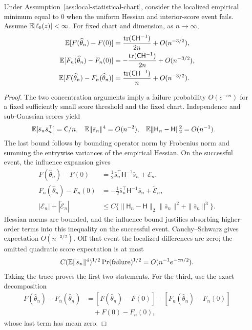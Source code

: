 \begin{theorem}
\label{thm:local-optimism}
Under Assumption~\ref{ass:local-statistical-chart}, consider the
localized empirical minimum equal to $0$ when the uniform Hessian
and interior-score event fails. Assume $\mathbb E|\ell_0(z)|<\infty$.
For fixed chart and dimension, as $n\to\infty$,
\begin{align}
\mathbb E[F(\widehat\theta_n)-F(0)]
&=\frac{\operatorname{tr}(\mathsf C\mathsf H^{-1})}{2n}
+O(n^{-3/2}),\\
\mathbb E[F_n(\widehat\theta_n)-F_n(0)]
&=-\frac{\operatorname{tr}(\mathsf C\mathsf H^{-1})}{2n}
+O(n^{-3/2}),\\
\mathbb E[F(\widehat\theta_n)-F_n(\widehat\theta_n)]
&=\frac{\operatorname{tr}(\mathsf C\mathsf H^{-1})}{n}
+O(n^{-3/2}).
\label{eq:local-optimism}
\end{align}
\end{theorem}
\begin{proof}
The two concentration arguments imply a failure probability
$O(e^{-cn})$ for a fixed sufficiently small score threshold and
the fixed chart. Independence and sub-Gaussian scores yield
\begin{align}
\mathbb E[\bar s_n\bar s_n^\top]&=\mathsf C/n,&
\mathbb E\|\bar s_n\|^4&=O(n^{-2}),&
\mathbb E\|\mathsf H_n-\mathsf H\|_2^2&=O(n^{-1}).
\end{align}
The last bound follows by bounding operator norm by Frobenius norm
and summing the entrywise variances of the empirical Hessian.
On the successful event, the influence expansion gives
\begin{align}
F(\widehat\theta_n)-F(0)
&=\tfrac12\bar s_n^\top\mathsf H^{-1}\bar s_n+\mathcal E_n,\\
F_n(\widehat\theta_n)-F_n(0)
&=-\tfrac12\bar s_n^\top\mathsf H^{-1}\bar s_n+\widetilde{\mathcal E}_n,\\
|\mathcal E_n|+|\widetilde{\mathcal E}_n|
&\leq C\{\|\mathsf H_n-\mathsf H\|_2\|\bar s_n\|^2+
\|\bar s_n\|^3\}.
\end{align}
Hessian norms are bounded, and the influence bound justifies
absorbing higher-order terms into this inequality on the
successful event. Cauchy--Schwarz gives expectation $O(n^{-3/2})$.
Off that event the localized differences are zero; the omitted
quadratic score expectation is at most
\begin{equation}
C(\mathbb E\|\bar s_n\|^4)^{1/2}
\Pr(\text{failure})^{1/2}=O(n^{-1}e^{-cn/2}).
\end{equation}
Taking the trace proves the first two statements. For the third,
use the exact decomposition
\begin{align}
F(\widehat\theta_n)-F_n(\widehat\theta_n)
&=[F(\widehat\theta_n)-F(0)]
-[F_n(\widehat\theta_n)-F_n(0)]\\
&\quad+F(0)-F_n(0),
\end{align}
whose last term has mean zero.
\end{proof}

